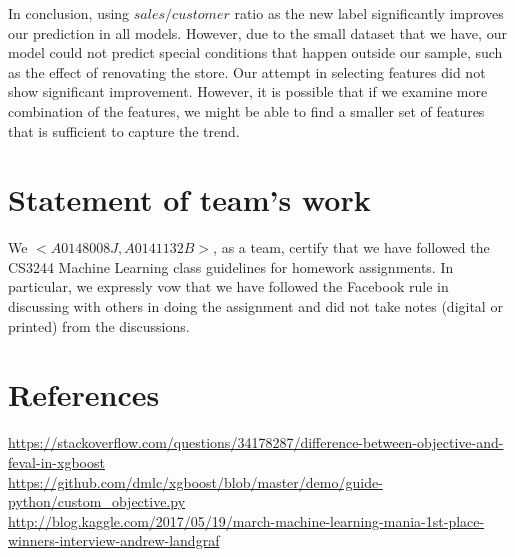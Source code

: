 \documentclass{article}
\begin{document}
In conclusion, using $sales/customer$ ratio as the new label significantly improves our prediction in all models. However, due to the small dataset that we have, our model could not predict special conditions that happen outside our sample, such as the effect of renovating the store. Our attempt in selecting features did not show significant improvement. However, it is possible that if we examine more combination of the features, we might be able to find a smaller set of features that is sufficient to capture the trend.

\newpage

\section{Statement of team's work}

We $<A0148008J, A0141132B>$, as a team, certify that we have followed the CS3244 Machine Learning class guidelines for homework assignments.  In particular, we expressly vow that we have followed the Facebook rule in discussing with others in doing the assignment and did not take notes (digital or printed) from the discussions.  


\section{References}
\url{https://stackoverflow.com/questions/34178287/difference-between-objective-and-feval-in-xgboost}\\
\url{https://github.com/dmlc/xgboost/blob/master/demo/guide-python/custom_objective.py}\\
\url{http://blog.kaggle.com/2017/05/19/march-machine-learning-mania-1st-place-winners-interview-andrew-landgraf}\\
\end{document}

